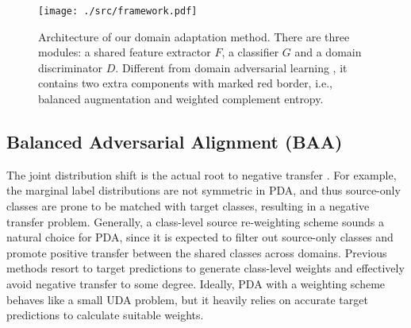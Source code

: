 \documentclass[runningheads]{llncs}
\begin{document}
\begin{figure*}[t]
	\centering
	\texttt{[image: ./src/framework.pdf]}
	\caption{Architecture of our domain adaptation method. There are three modules: a shared feature extractor $F$, a classifier $G$ and a domain discriminator $D$. Different from domain adversarial learning \cite{ganin2015unsupervised}, it contains two extra components with marked red border, i.e., balanced augmentation and weighted complement entropy.}
	\label{fig:framework}
\end{figure*}
	
\subsection{Balanced Adversarial Alignment (BAA)}
\label{sec:baa}
The joint distribution shift is the actual root to negative transfer \cite{wang2019characterizing}. 
For example, the marginal label distributions are not symmetric in PDA, and thus source-only classes are prone to be matched with target classes, resulting in a negative transfer problem. 
Generally, a class-level source re-weighting scheme sounds a natural choice for PDA, since it is expected to filter out source-only classes and promote positive transfer between the shared classes across domains.
Previous methods \cite{cao2018partial,matsuura2018twins} resort to target predictions to generate class-level weights and effectively avoid negative transfer to some degree.
Ideally, PDA with a weighting scheme behaves like a small UDA problem, but it heavily relies on accurate target predictions to calculate suitable weights.
	
\end{document}
